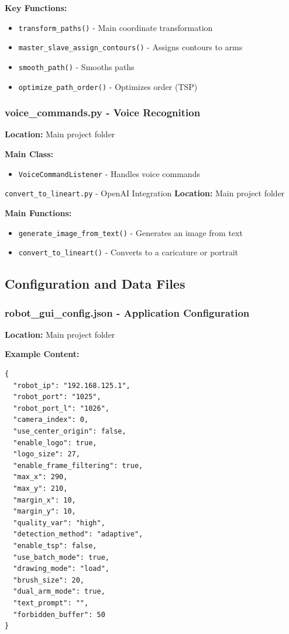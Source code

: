 \documentclass[a4paper,12pt]{article}
\begin{document}
\textbf{Key Functions:}
\begin{itemize}
\item \texttt{transform\_paths()} - Main coordinate transformation
\item \texttt{master\_slave\_assign\_contours()} - Assigns contours to arms
\item \texttt{smooth\_path()} - Smooths paths
\item \texttt{optimize\_path\_order()} - Optimizes order (TSP)
\end{itemize}

\subsubsection{voice\_commands.py - Voice Recognition}
\textbf{Location:} Main project folder

\textbf{Main Class:}
\begin{itemize}
\item \texttt{VoiceCommandListener} - Handles voice commands
\end{itemize}

\texttt{convert\_to\_lineart.py} - OpenAI Integration
\textbf{Location:} Main project folder

\textbf{Main Functions:}
\begin{itemize}
\item \texttt{generate\_image\_from\_text()} - Generates an image from text
\item \texttt{convert\_to\_lineart()} - Converts to a caricature or portrait
\end{itemize}

\subsection{Configuration and Data Files}

\subsubsection{robot\_gui\_config.json - Application Configuration}
\textbf{Location:} Main project folder

\textbf{Example Content:}
\begin{verbatim}
{
  "robot_ip": "192.168.125.1",
  "robot_port": "1025",
  "robot_port_l": "1026",
  "camera_index": 0,
  "use_center_origin": false,
  "enable_logo": true,
  "logo_size": 27,
  "enable_frame_filtering": true,
  "max_x": 290,
  "max_y": 210,
  "margin_x": 10,
  "margin_y": 10,
  "quality_var": "high",
  "detection_method": "adaptive",
  "enable_tsp": false,
  "use_batch_mode": true,
  "drawing_mode": "load",
  "brush_size": 20,
  "dual_arm_mode": true,
  "text_prompt": "",
  "forbidden_buffer": 50
}
\end{verbatim}
\end{document}

